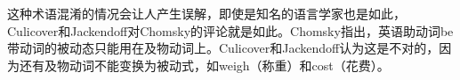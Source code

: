这种术语混淆的情况会让人产生误解，即使是知名的语言学家也是如此，Culicover和Jackendoff\citeyearpar[]{CJ2005a}对Chomsky的评论就是如此。Chomsky指出，英语助动词be带动词的被动态只能用在及物动词上。Culicover和Jackendoff认为这是不对的，因为还有及物动词不能变换为被动式，如weigh（称重）和cost（花费）。 
\eal
{}
\zl


